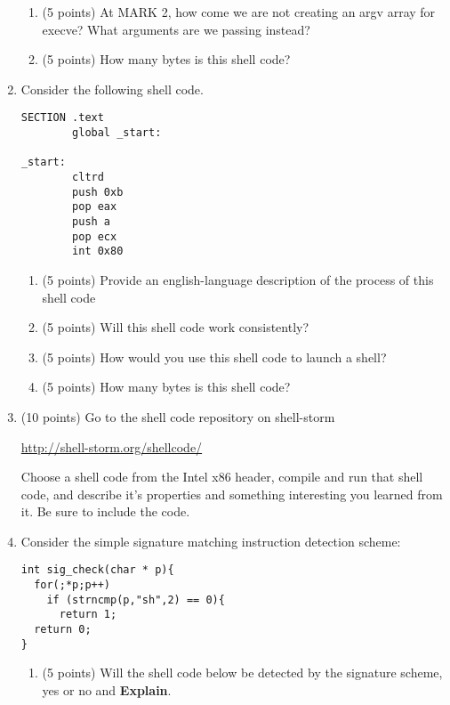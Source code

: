 \documentclass{article}[9pt]
\begin{document}
\begin{enumerate}
\begin{enumerate}
\item (5 points) At MARK 2, how come we are not creating an argv array for
execve? What arguments are we passing instead?

\item (5 points) How many bytes is this shell code?
\end{enumerate}

\item Consider the following shell code. 

\begin{verbatim}
SECTION .text
        global _start:

_start:
        cltrd
        push 0xb
        pop eax
        push a
        pop ecx
        int 0x80
\end{verbatim}

\begin{enumerate}
\item (5 points) Provide an english-language description of the process of this shell code

\item (5 points) Will this shell code work consistently?

\item (5 points) How would you use this shell code to launch a shell?

\item (5 points) How many bytes is this shell code?
\end{enumerate}

\item (10 points) Go to the shell code repository on shell-storm

\url{http://shell-storm.org/shellcode/}

Choose a shell code from the Intel x86 header, compile and run
that shell code, and describe it's properties and something
interesting you learned from it. Be sure to include the code.

\item Consider the simple signature matching instruction detection scheme:

\begin{verbatim}
int sig_check(char * p){
  for(;*p;p++)
    if (strncmp(p,"sh",2) == 0){
      return 1;
  return 0;
}
\end{verbatim}

\begin{enumerate}
\item (5 points) Will the shell code below be detected by the signature scheme, yes or no and \textbf{Explain}. 


\end{enumerate}
\end{enumerate}
\end{document}
